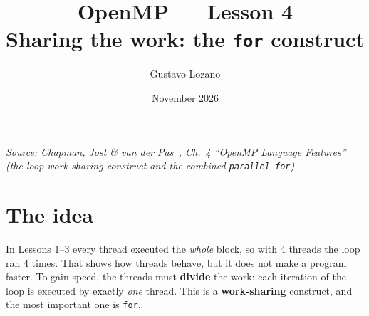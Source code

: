 \documentclass[11pt,a4paper]{article}
\title{\textbf{OpenMP --- Lesson 4}\\[4pt]\large Sharing the work: the \texttt{for} construct}
\author{Gustavo Lozano}
\date{November 2026}
\begin{document}
\maketitle

\noindent\textit{\small Source: Chapman, Jost \& van der Pas~\cite{chapman}, Ch.~4
``OpenMP Language Features'' (the loop work-sharing construct and the combined
\texttt{parallel for}).}

\section{The idea}
In Lessons 1--3 every thread executed the \emph{whole} block, so with 4 threads the loop
ran 4 times. That shows how threads behave, but it does not make a program faster. To gain
speed, the threads must \textbf{divide} the work: each iteration of the loop is executed by
exactly \emph{one} thread. This is a \textbf{work-sharing} construct, and the most
important one is \texttt{for}.

\begin{center}
\end{center}
\end{document}
